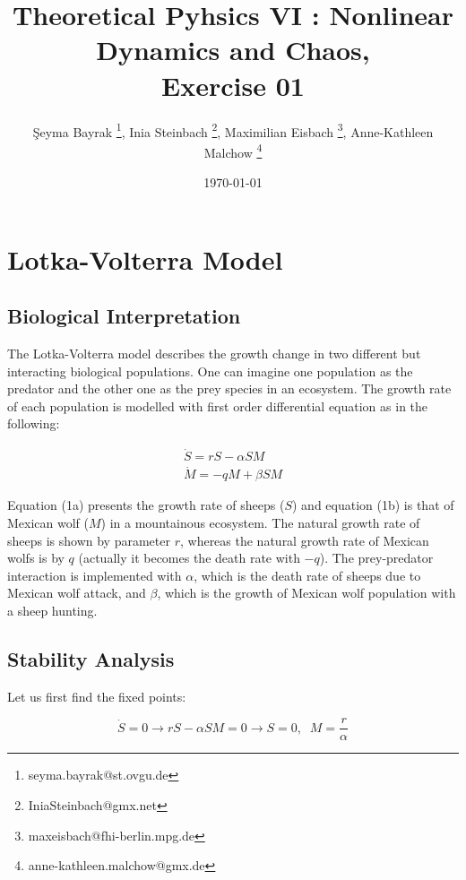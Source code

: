 \documentclass[12pt]{article}
\title{Theoretical Pyhsics VI :  Nonlinear Dynamics and Chaos, \\ Exercise 01}
\author{\c{S}eyma Bayrak \thanks{seyma.bayrak@st.ovgu.de}, Inia Steinbach \thanks{IniaSteinbach@gmx.net}, Maximilian Eisbach \thanks{maxeisbach@fhi-berlin.mpg.de}, Anne-Kathleen Malchow \thanks{anne-kathleen.malchow@gmx.de}}
\date{\today}
\begin{document}
   \maketitle
   

	\section{Lotka-Volterra Model}	

\subsection{Biological Interpretation}

The Lotka-Volterra model describes the growth change in two different but interacting biological populations. One can imagine one population as the predator and the other one as the prey species in an ecosystem. The growth rate of each population is modelled with first order differential equation as in the following:

\begin{subequations}
 \begin{align}\dot{S} = rS - \alpha SM \label{eqn: frobenius 1}\\  \dot{M} = -qM + \beta SM \label{eqn: frobenius 2} 
 \end{align} 
\end{subequations}

Equation (1a) presents the growth rate of sheeps ($S$) and equation (1b) is that of Mexican wolf ($M$) in a mountainous ecosystem. The natural growth rate of sheeps is shown by parameter $r$, whereas the natural growth rate of Mexican wolfs is by $q$ (actually it becomes the death rate with $-q$). The prey-predator interaction is implemented with $\alpha$, which is the death rate of sheeps due to Mexican wolf attack, and $\beta$, which is the growth of Mexican wolf population with a sheep hunting.

\newpage

\subsection{Stability Analysis}

Let us first find the fixed points:

\begin{equation*}
\dot{S} = 0 \longrightarrow rS - \alpha SM = 0 \longrightarrow S =0, \;\; M=\frac{r}{\alpha} 
\end{equation*}
\end{document}
